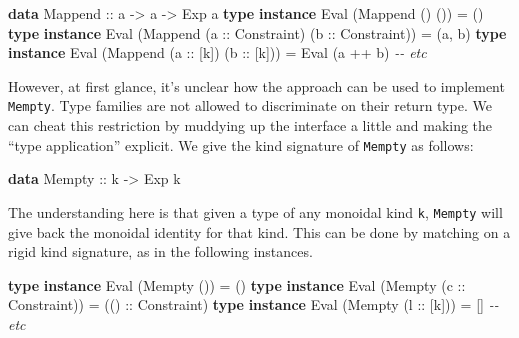 \documentclass[
  11pt,
]{book}
\newenvironment{Shaded}{}{}
\newcommand{\CharTok}[1]{\textcolor[rgb]{0.25,0.44,0.63}{#1}}
\newcommand{\CommentTok}[1]{\textcolor[rgb]{0.38,0.63,0.69}{\textit{#1}}}
\newcommand{\DataTypeTok}[1]{\textcolor[rgb]{0.56,0.13,0.00}{#1}}
\newcommand{\KeywordTok}[1]{\textcolor[rgb]{0.00,0.44,0.13}{\textbf{#1}}}
\newcommand{\NormalTok}[1]{#1}
\newcommand{\OperatorTok}[1]{\textcolor[rgb]{0.40,0.40,0.40}{#1}}
\newcommand{\OtherTok}[1]{\textcolor[rgb]{0.00,0.44,0.13}{#1}}
\theoremstyle{nonumberplain}
\begin{document}
\begin{Shaded}
\begin{Highlighting}[]
\KeywordTok{data} \DataTypeTok{Mappend}\OtherTok{ ::}\NormalTok{ a }\OtherTok{{-}\textgreater{}}\NormalTok{ a }\OtherTok{{-}\textgreater{}} \DataTypeTok{Exp}\NormalTok{ a}
\KeywordTok{type} \KeywordTok{instance} \DataTypeTok{Eval}
\NormalTok{  (}\DataTypeTok{Mappend} \CharTok{\textquotesingle{}() \textquotesingle{}}\NormalTok{()) }\OtherTok{=} \CharTok{\textquotesingle{}()}
\KeywordTok{type} \KeywordTok{instance} \DataTypeTok{Eval}
\NormalTok{  (}\DataTypeTok{Mappend}\NormalTok{ (}\OtherTok{a ::} \DataTypeTok{Constraint}\NormalTok{)}
\NormalTok{           (}\OtherTok{b ::} \DataTypeTok{Constraint}\NormalTok{)) }\OtherTok{=}\NormalTok{ (a, b)}
\KeywordTok{type} \KeywordTok{instance} \DataTypeTok{Eval}
\NormalTok{  (}\DataTypeTok{Mappend}\NormalTok{ (}\OtherTok{a ::}\NormalTok{ [k])}
\NormalTok{           (}\OtherTok{b ::}\NormalTok{ [k])) }\OtherTok{=} \DataTypeTok{Eval}\NormalTok{ (a }\OperatorTok{++}\NormalTok{ b)}
\CommentTok{{-}{-} etc}
\end{Highlighting}
\end{Shaded}

However, at first glance, it's unclear how the approach can be used to
implement \texttt{Mempty}. Type families are not allowed to discriminate
on their return type. We can cheat this restriction by muddying up the
interface a little and making the ``type application'' explicit. We give
the kind signature of \texttt{Mempty} as follows:

\begin{Shaded}
\begin{Highlighting}[]
\KeywordTok{data} \DataTypeTok{Mempty}\OtherTok{ ::}\NormalTok{ k }\OtherTok{{-}\textgreater{}} \DataTypeTok{Exp}\NormalTok{ k}
\end{Highlighting}
\end{Shaded}

The understanding here is that given a type of any monoidal kind
\texttt{k}, \texttt{Mempty} will give back the monoidal identity for
that kind. This can be done by matching on a rigid kind signature, as in
the following instances.

\begin{Shaded}
\begin{Highlighting}[]
\KeywordTok{type} \KeywordTok{instance} \DataTypeTok{Eval}
\NormalTok{  (}\DataTypeTok{Mempty} \CharTok{\textquotesingle{}()) = \textquotesingle{}}\NormalTok{()}
\KeywordTok{type} \KeywordTok{instance} \DataTypeTok{Eval}
\NormalTok{  (}\DataTypeTok{Mempty}\NormalTok{ (}\OtherTok{c ::} \DataTypeTok{Constraint}\NormalTok{))}
    \OtherTok{=}\NormalTok{ (}\OtherTok{() ::} \DataTypeTok{Constraint}\NormalTok{)}
\KeywordTok{type} \KeywordTok{instance} \DataTypeTok{Eval}
\NormalTok{  (}\DataTypeTok{Mempty}\NormalTok{ (}\OtherTok{l ::}\NormalTok{ [k])) }\OtherTok{=} \CharTok{\textquotesingle{}[]}
\CommentTok{{-}{-} etc}
\end{Highlighting}
\end{Shaded}
\end{document}
